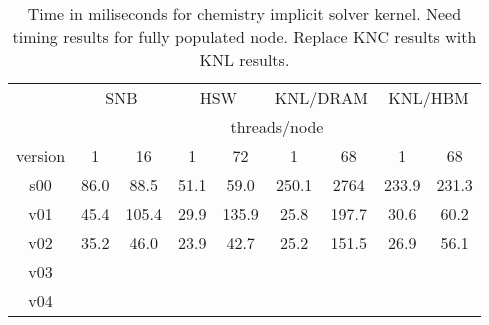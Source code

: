 \begin{table}
\begin{center}
\begin{tabular}{|c|c|c|c|c|c|c|c|c|}
\hline
        & \multicolumn{2}{c|}{SNB} & \multicolumn{2}{c|}{HSW} & \multicolumn{2}{c|}{KNL/DRAM} & \multicolumn{2}{c|}{KNL/HBM} \\
        & \multicolumn{8}{c|}{threads/node} \\
version &    1  & 16    & 1    & 72  & 1      & 68    & 1 & 68 \\
\hline \hline
s00     &  86.0 & 88.5  & 51.1 & 59.0  & 250.1  & 2764  & 233.9 & 231.3 \\
v01     &  45.4 & 105.4 & 29.9 & 135.9 &  25.8  & 197.7 & 30.6  & 60.2 \\
v02     &  35.2 &  46.0 & 23.9 &  42.7 &  25.2  & 151.5 & 26.9  & 56.1 \\
v03     &       &       &      &       &        &       &       &    \\
v04     &       &       &      &       &        &       &       &    \\
\hline
\end{tabular}
\caption{Time in miliseconds for chemistry implicit solver kernel. {\color{red}  Need timing results for fully populated node.  Replace KNC results with KNL results.}\label{tbl:chem-timing}}
\end{center}
\end{table}

